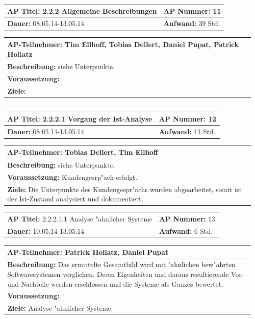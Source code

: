 \documentclass[fontsize=12pt,paper=a4,twoside]{scrartcl}
\begin{document}
\begin{verbatim}

\end{verbatim}
\begin{tabular}{|p{7.43cm}|p{7.43cm}|}
\hline
\textbf{AP Titel: }2.2.2 Allgemeine Beschreibungen & \textbf{AP Nummer: }11\\ 
\hline
\textbf{Dauer: }08.05.14-13.05.14 & \textbf{Aufwand: }39 Std.\\
\hline
\end{tabular}
\begin{tabular}{|p{15.3cm}|}
\hline
\textbf{AP-Teilnehmer: }Tim Ellhoff, Tobias Dellert, Daniel Pupat, Patrick Hollatz\\
\hline
\textbf{Beschreibung: }siehe Unterpunkte.\\
\hline
\textbf{Voraussetzung: }\\
\hline 
\textbf{Ziele: }\\
\hline 
\end{tabular}
\begin{verbatim}

\end{verbatim}
\begin{tabular}{|p{7.43cm}|p{7.43cm}|}
\hline
\textbf{AP Titel: }2.2.2.1 Vorgang der Ist-Analyse & \textbf{AP Nummer: }12\\ 
\hline
\textbf{Dauer: }08.05.14-13.05.14 & \textbf{Aufwand: }11 Std.\\
\hline
\end{tabular}
\begin{tabular}{|p{15.3cm}|}
\hline
\textbf{AP-Teilnehmer: }Tobias Dellert, Tim Ellhoff\\
\hline
\textbf{Beschreibung: }siehe Unterpunkte.\\
\hline
\textbf{Voraussetzung: }Kundengesrp"ach erfolgt.\\
\hline 
\textbf{Ziele: }Die Unterpunkte des Kundengespr"achs wurden abgearbeitet, somit ist der Ist-Zustand analysiert und dokumentiert.\\
\hline 
\end{tabular}

\begin{tabular}{|p{7.43cm}|p{7.43cm}|}
\hline
\textbf{AP Titel: }2.2.2.1.1 Analyse "ahnlicher Systeme & \textbf{AP Nummer: }13\\
\textbf{Dauer: }10.05.14-13.05.14 & \textbf{Aufwand: }6 Std.\\
\hline
\end{tabular}
\begin{tabular}{|p{15.3cm}|}
\hline
\textbf{AP-Teilnehmer: }Patrick Hollatz, Daniel Pupat\\
\hline
\textbf{Beschreibung: }Das ermittelte Gesamtbild wird mit "ahnlichen bew"ahrten Softwaresystemen verglichen. Deren Eigenheiten und daraus resultierende Vor- und Nachteile werden erschlossen und die Systeme als Ganzes bewertet.\\
\hline
\textbf{Voraussetzung: }\\
\hline 
\textbf{Ziele: }Analyse "ahnlicher Systeme.\\
\hline 
\end{tabular}
\end{document}
